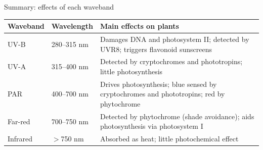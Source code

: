 \documentclass[aspectratio=169,11pt]{beamer}
\newcommand{\wavecol}[2]{\definecolor{tmpwave}{wave}{#2}\colorlet{#1}[rgb]{tmpwave}}
\begin{document}
\begin{frame}{Summary: effects of each waveband}
\centering\small
\renewcommand{\arraystretch}{1.35}
\begin{tabular}{@{}p{2.1cm}p{2.4cm}p{8.6cm}@{}}
\textbf{Waveband} & \textbf{Wavelength} & \textbf{Main effects on plants}\\\hline
UV-B & 280--315 nm & Damages DNA and photosystem II; detected by UVR8; triggers flavonoid sunscreens\\
UV-A & 315--400 nm & Detected by cryptochromes and phototropins; little photosynthesis\\
PAR & 400--700 nm & Drives photosynthesis; blue sensed by cryptochromes and phototropins; red by phytochrome\\
Far-red & 700--750 nm & Detected by phytochrome (shade avoidance); aids photosynthesis via photosystem I\\
Infrared & $>$750 nm & Absorbed as heat; little photochemical effect\\\hline
\end{tabular}
\vspace{10pt}

\end{frame}
\end{document}
